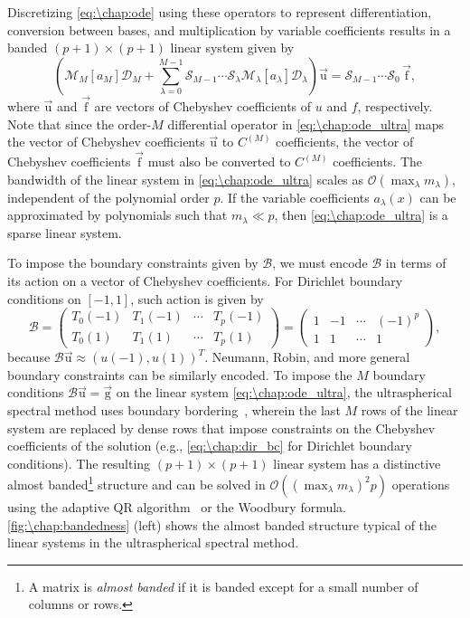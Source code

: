 Discretizing \cref{eq:\chap:ode} using these operators to represent differentiation, conversion between bases, and multiplication by variable coefficients results in a banded $(p+1) \times (p+1)$ linear system given by
\begin{equation}\label{eq:\chap:ode_ultra}
\left( \mathcal{M}_M[a_M] \mathcal{D}_M + \sum_{\lambda=0}^{M-1} \mathcal{S}_{M-1} \cdots \mathcal{S}_\lambda \mathcal{M}_\lambda[a_\lambda] \mathcal{D}_\lambda \right) \vec{\mathrm{u}} = \mathcal{S}_{M-1} \cdots \mathcal{S}_0 \, \vec{\mathrm{f}},
\end{equation}
where $\vec{\mathrm{u}}$ and $\vec{\mathrm{f}}$ are vectors of Chebyshev coefficients of $u$ and $f$, respectively. Note that since the order-$M$ differential operator in \cref{eq:\chap:ode_ultra} maps the vector of Chebyshev coefficients $\vec{\mathrm{u}}$ to $C^{(M)}$ coefficients, the vector of Chebyshev coefficients $\vec{\mathrm{f}}$ must also be converted to $C^{(M)}$ coefficients. The bandwidth of the linear system in \cref{eq:\chap:ode_ultra} scales as $\mathcal{O}(\max_\lambda m_\lambda)$, independent of the polynomial order $p$. If the variable coefficients $a_\lambda(x)$ can be approximated by polynomials such that $m_\lambda \ll p$, then \cref{eq:\chap:ode_ultra} is a sparse linear system.

To impose the boundary constraints given by $\mathcal{B}$, we must encode $\mathcal{B}$ in terms of its action on a vector of Chebyshev coefficients. For Dirichlet boundary conditions on $[-1,1]$, such action is given by
\begingroup
\renewcommand*{\arraystretch}{1.2}
\begin{equation}\label{eq:\chap:dir_bc}
\mathcal{B} = \begin{pmatrix}
T_0(-1) & T_1(-1) & \cdots & T_p(-1) \\
T_0(1) & T_1(1) & \cdots & T_p(1)
\end{pmatrix} = \begin{pmatrix}
1 & -1 & \cdots & (-1)^p \\
1 & 1 & \cdots & 1
\end{pmatrix},
\end{equation}
\endgroup
because $\mathcal{B}\vec{\mathrm{u}} \approx (u(-1), u(1))^T$. Neumann, Robin, and more general boundary constraints can be similarly encoded. To impose the $M$ boundary conditions $\mathcal{B}\vec{\mathrm{u}}=\vec{\mathrm{g}}$ on the linear system \cref{eq:\chap:ode_ultra}, the ultraspherical spectral method uses boundary bordering~\cite{Boyd_01_01}, wherein the last $M$ rows of the linear system are replaced by dense rows that impose constraints on the Chebyshev coefficients of the solution (e.g., \cref{eq:\chap:dir_bc} for Dirichlet boundary conditions). The resulting $(p+1) \times (p+1)$ linear system has a distinctive almost banded\footnote{A matrix is \emph{almost banded} if it is banded except for a small number of columns or rows.} structure and can be solved in $\mathcal{O}((\max_\lambda m_\lambda)^2 p)$ operations using the adaptive QR algorithm~\cite{Olver_13_01} or the Woodbury formula. \cref{fig:\chap:bandedness} (left) shows the almost banded structure typical of the linear systems in the ultraspherical spectral method.


